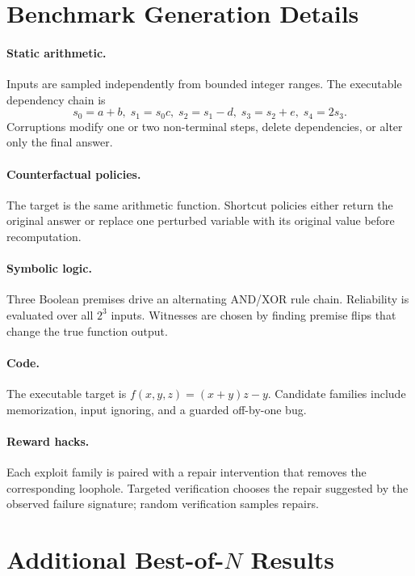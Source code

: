 \documentclass[10pt]{article}
\begin{document}
\appendix

\section{Benchmark Generation Details}

\paragraph{Static arithmetic.}
Inputs are sampled independently from bounded integer ranges. The executable dependency chain is
\[
s_0=a+b,\;
s_1=s_0c,\;
s_2=s_1-d,\;
s_3=s_2+e,\;
s_4=2s_3.
\]
Corruptions modify one or two non-terminal steps, delete dependencies, or alter only the final answer.

\paragraph{Counterfactual policies.}
The target is the same arithmetic function. Shortcut policies either return the original answer or replace one perturbed variable with its original value before recomputation.

\paragraph{Symbolic logic.}
Three Boolean premises drive an alternating AND/XOR rule chain. Reliability is evaluated over all $2^3$ inputs. Witnesses are chosen by finding premise flips that change the true function output.

\paragraph{Code.}
The executable target is $f(x,y,z)=(x+y)z-y$. Candidate families include memorization, input ignoring, and a guarded off-by-one bug.

\paragraph{Reward hacks.}
Each exploit family is paired with a repair intervention that removes the corresponding loophole. Targeted verification chooses the repair suggested by the observed failure signature; random verification samples repairs.

\section{Additional Best-of-$N$ Results}
\end{document}

